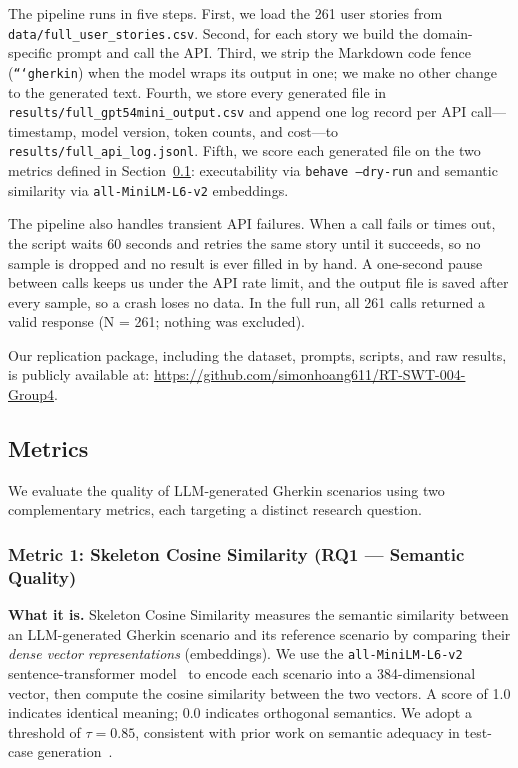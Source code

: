 The pipeline runs in five steps. First, we load the 261 user stories
from \texttt{data/full\_user\_stories.csv}. Second, for each story we
build the domain-specific prompt and call the API. Third, we strip the
Markdown code fence (\texttt{```gherkin}) when the model wraps its
output in one; we make no other change to the generated text. Fourth,
we store every generated file in
\texttt{results/full\_gpt54mini\_output.csv} and append one log record
per API call---timestamp, model version, token counts, and cost---to
\texttt{results/full\_api\_log.jsonl}. Fifth, we score each generated
file on the two metrics defined in Section~\ref{sec:metrics}:
executability via \texttt{behave --dry-run} and semantic similarity
via \texttt{all-MiniLM-L6-v2} embeddings.

The pipeline also handles transient API failures. When a call fails or
times out, the script waits 60 seconds and retries the same story
until it succeeds, so no sample is dropped and no result is ever
filled in by hand. A one-second pause between calls keeps us under the
API rate limit, and the output file is saved after every sample, so a
crash loses no data. In the full run, all 261 calls returned a valid
response (N = 261; nothing was excluded).

Our replication package, including the dataset, prompts, scripts, and
raw results, is publicly available at:
\url{https://github.com/simonhoang611/RT-SWT-004-Group4}.

\subsection{Metrics}
\label{sec:metrics}

We evaluate the quality of LLM-generated Gherkin scenarios using two complementary metrics,
each targeting a distinct research question.

\subsubsection{Metric 1: Skeleton Cosine Similarity (RQ1 — Semantic Quality)}
\label{sec:metric-skeleton}

\textbf{What it is.}
Skeleton Cosine Similarity measures the semantic similarity between an LLM-generated
Gherkin scenario and its reference scenario by comparing their \emph{dense vector
representations} (embeddings).
We use the \texttt{all-MiniLM-L6-v2} sentence-transformer model~\cite{reimers2019sentencebert}
to encode each scenario into a 384-dimensional vector, then compute the cosine similarity
between the two vectors.
A score of 1.0 indicates identical meaning; 0.0 indicates orthogonal semantics.
We adopt a threshold of $\tau = 0.85$, consistent with prior work on semantic adequacy
in test-case generation~\cite{fraser2011evosuite}.

